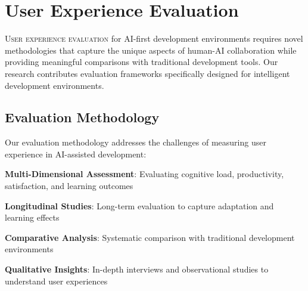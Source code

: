 
\section*{User Experience Evaluation}

\lettrine{U}{ser experience evaluation} for AI-first development environments requires novel methodologies that capture the unique aspects of human-AI collaboration while providing meaningful comparisons with traditional development tools. Our research contributes evaluation frameworks specifically designed for intelligent development environments.

\subsection*{Evaluation Methodology}

Our evaluation methodology addresses the challenges of measuring user experience in AI-assisted development:

\begin{compactlist}
    \item \textbf{Multi-Dimensional Assessment}: Evaluating cognitive load, productivity, satisfaction, and learning outcomes
    \item \textbf{Longitudinal Studies}: Long-term evaluation to capture adaptation and learning effects
    \item \textbf{Comparative Analysis}: Systematic comparison with traditional development environments
    \item \textbf{Qualitative Insights}: In-depth interviews and observational studies to understand user experiences
\end{compactlist}

